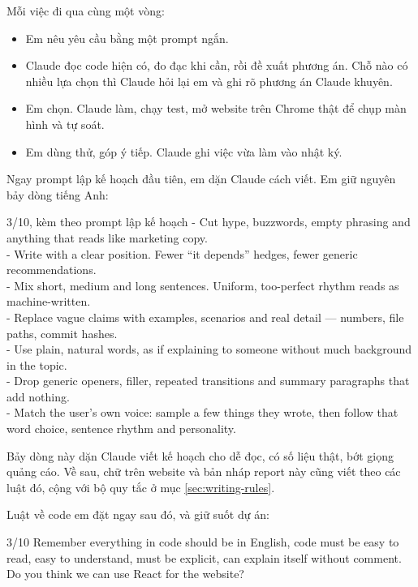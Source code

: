 Mỗi việc đi qua cùng một vòng:

\begin{itemize}
  \item Em nêu yêu cầu bằng một prompt ngắn.
  \item Claude đọc code hiện có, đo đạc khi cần, rồi đề xuất phương án. Chỗ nào có nhiều lựa chọn thì Claude hỏi lại em và ghi rõ phương án Claude khuyên.
  \item Em chọn. Claude làm, chạy test, mở website trên Chrome thật để chụp màn hình và tự soát.
  \item Em dùng thử, góp ý tiếp. Claude ghi việc vừa làm vào nhật ký.
\end{itemize}

Ngay prompt lập kế hoạch đầu tiên, em dặn Claude cách viết. Em giữ nguyên bảy dòng tiếng Anh:

\begin{promptbox}{3/10, kèm theo prompt lập kế hoạch}
- Cut hype, buzzwords, empty phrasing and anything that reads like marketing copy.\\
- Write with a clear position. Fewer “it depends” hedges, fewer generic recommendations.\\
- Mix short, medium and long sentences. Uniform, too-perfect rhythm reads as machine-written.\\
- Replace vague claims with examples, scenarios and real detail — numbers, file paths, commit hashes.\\
- Use plain, natural words, as if explaining to someone without much background in the topic.\\
- Drop generic openers, filler, repeated transitions and summary paragraphs that add nothing.\\
- Match the user's own voice: sample a few things they wrote, then follow that word choice, sentence rhythm and personality.
\end{promptbox}

Bảy dòng này dặn Claude viết kế hoạch cho dễ đọc, có số liệu thật, bớt giọng quảng cáo. Về sau, chữ trên website và bản nháp report này cũng viết theo các luật đó, cộng với bộ quy tắc ở mục \ref{sec:writing-rules}.

Luật về code em đặt ngay sau đó, và giữ suốt dự án:

\begin{promptbox}{3/10}
Remember everything in code should be in English, code must be easy to read, easy to understand, must be explicit, can explain itself without comment. Do you think we can use React for the website?
\end{promptbox}

